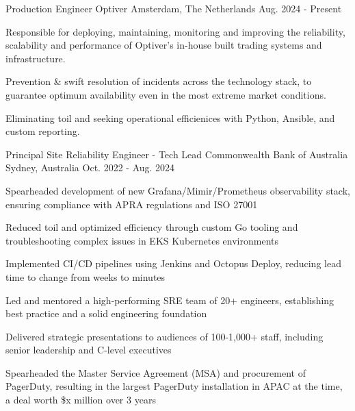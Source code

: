 

\begin{cventries}
  \cventry
    {Production Engineer} %
    {Optiver} %
    {Amsterdam, The Netherlands} %
    {Aug. 2024 - Present} %
    {
      \begin{cvitems} %
      \item {Responsible for deploying, maintaining, monitoring and improving the reliability, scalability and performance of Optiver's in-house built trading systems and infrastructure.}
      \item {Prevention \& swift resolution of incidents across the technology stack, to guarantee optimum availability even in the most extreme market conditions. }
       \item {Eliminating toil and seeking operational efficienices with Python, Ansible, and custom reporting.}
      \end{cvitems}
    }

  \cventry
    {Principal Site Reliability Engineer - Tech Lead} %
    {Commonwealth Bank of Australia} %
    {Sydney, Australia} %
    {Oct. 2022 - Aug. 2024} %
    {
      \begin{cvitems} %
      \item {Spearheaded development of new Grafana/Mimir/Prometheus observability stack, ensuring compliance with APRA regulations and ISO 27001}
      \item {Reduced toil and optimized efficiency through custom Go tooling and troubleshooting complex issues in EKS Kubernetes environments}
      \item {Implemented CI/CD pipelines using Jenkins and Octopus Deploy, reducing lead time to change from weeks to minutes}
      \item {Led and mentored a high-performing SRE team of 20+ engineers, establishing best practice and a solid engineering foundation}
      \item {Delivered strategic presentations to audiences of 100-1,000+ staff, including senior leadership and C-level executives}
      \item {Spearheaded the Master Service Agreement (MSA) and procurement of PagerDuty, resulting in the largest PagerDuty installation in APAC at the time, a deal worth \$x million over 3 years}
      \end{cvitems}
    }



\end{cventries}
